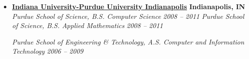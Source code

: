 %
\begin{itemize}
    \parskip=0.1em

    \item
    \headerrow
        {\textbf{\href{https://www.iupui.edu/}{Indiana University-Purdue University Indianapolis}}}
        {\textbf{Indianapolis, IN}}
    \\
    \headerrow
        {\emph{Purdue School of Science, B.S. Computer Science}}
        {\emph{2008 -- 2011}}
    \headerrow
        {\emph{Purdue School of Science, B.S. Applied Mathematics}}
        {\emph{2008 -- 2011}}

    \headerrow
        {\emph{Purdue School of Engineering \& Technology, A.S. Computer and Information Technology}}
        {\emph{2006 -- 2009}}

\end{itemize}

